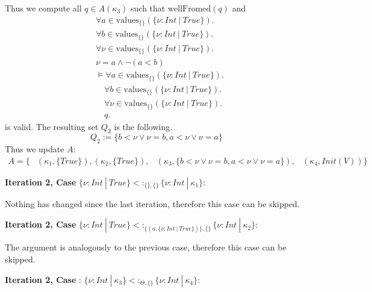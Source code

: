 \documentclass[]{scrbook}
\theoremstyle{definition}
\theoremstyle{definition}
\theoremstyle{definition}
\theoremstyle{remark}
\begin{document}
Thus we compute all \(q\in A(\kappa_3)\) such that
\(\text{wellFromed}(q)\) and \[
\begin{aligned}
&\forall a\in\text{values}_{\{\}}(\{\nu:\mathit{Int}\ |\ \mathit{True}\}).\\
&\forall b\in\text{values}_{\{\}}(\{\nu:\mathit{Int}\ |\ \mathit{True}\}).\\
&\forall \nu\in\text{values}_{\{\}}(\{\nu:\mathit{Int}\ |\ \mathit{True}\}).\\
&\nu = a \land \neg (a < b)\\
&\vDash\forall a\in\text{values}_{\{\}}(\{\nu:\mathit{Int}\ |\ \mathit{True}\}).\\
&\quad\forall b\in\text{values}_{\{\}}(\{\nu:\mathit{Int}\ |\ \mathit{True}\}).\\
&\quad\forall \nu\in\text{values}_{\{\}}(\{\nu:\mathit{Int}\ |\ \mathit{True}\}).\\
&\quad q.
\end{aligned}
\] is valid. The resulting set \(Q_2\) is the following. \[
Q_2 := \{b < \nu \lor \nu = b, a < \nu \lor \nu = a\}
\] Thus we update \(A\): \[
\begin{aligned}
A = \{ &(\kappa_1,\{\mathit{True}\}),(\kappa_2,\{\mathit{True}\}),
  &(\kappa_3, \{b < \nu \lor \nu = b, a < \nu \lor \nu = a\}),
  &(\kappa_4,\mathit{Init}(V))\}
\end{aligned}
\]

\textbf{Iteration 2, Case }
\(\{\nu:\mathit{Int}\ |\ \mathit{True}\}<:_{\{\},\{\}}\{\nu:\mathit{Int}\ |\ \kappa_1\}\):

Nothing has changed since the last iteration, therefore this case can be
skipped.

\textbf{Iteration 2, Case }
\(\{\nu:\mathit{Int}\ |\ \mathit{True}\}<:_{\{(a,\{\nu:\mathit{Int}\ |\ \mathit{True}\})\},\{\}}\{\nu:\mathit{Int}\ |\ \kappa_2\}\):

The argument is analogously to the previous case, therefore this case
can be skipped.

\textbf{Iteration 2, Case }:
\(\{\nu:\mathit{Int}\ |\ \kappa_3\}<:_{\Theta,\{\}}\{\nu:\mathit{Int}\ |\ \kappa_4\}\):
\end{document}
